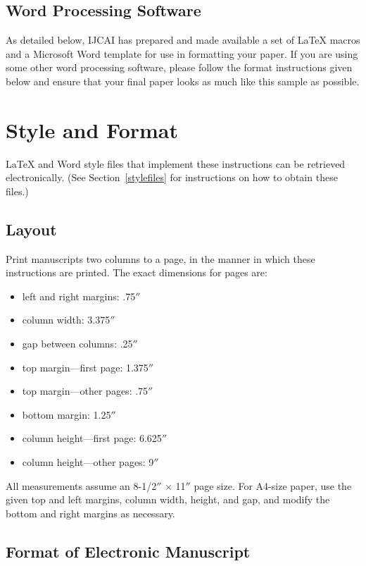 \documentclass{article}
\begin{document}
\subsection{Word Processing Software}

As detailed below, IJCAI has prepared and made available a set of
\LaTeX{} macros and a Microsoft Word template for use in formatting
your paper. If you are using some other word processing software, please follow the format instructions given below and ensure that your final paper looks as much like this sample as possible.

\section{Style and Format}

\LaTeX{} and Word style files that implement these instructions
can be retrieved electronically. (See Section~\ref{stylefiles} for
instructions on how to obtain these files.)

\subsection{Layout}

Print manuscripts two columns to a page, in the manner in which these
instructions are printed. The exact dimensions for pages are:
\begin{itemize}
    \item left and right margins: .75$''$
    \item column width: 3.375$''$
    \item gap between columns: .25$''$
    \item top margin---first page: 1.375$''$
    \item top margin---other pages: .75$''$
    \item bottom margin: 1.25$''$
    \item column height---first page: 6.625$''$
    \item column height---other pages: 9$''$
\end{itemize}

All measurements assume an 8-1/2$''$ $\times$ 11$''$ page size. For
A4-size paper, use the given top and left margins, column width,
height, and gap, and modify the bottom and right margins as necessary.

\subsection{Format of Electronic Manuscript}
\end{document}
